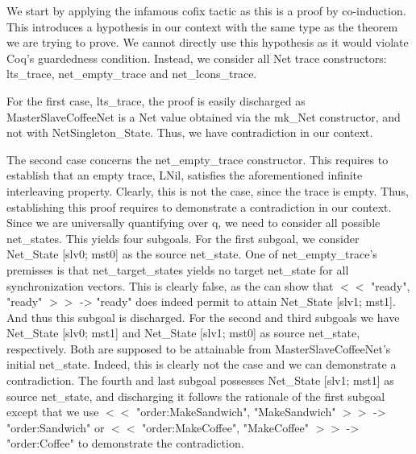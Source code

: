 \begin{theorem} \label{th:msproof2} 
			
		We start by applying the infamous \textsf{cofix} tactic as this is a proof by co-induction. This
		introduces a hypothesis in our context with the same type as the theorem we are trying to prove.
		We cannot directly use this hypothesis as it would violate Coq's guardedness condition.		
		Instead, we consider all \textsf{Net} trace constructors: \textsf{lts\_trace},
		\textsf{net\_empty\_trace} and \textsf{net\_lcons\_trace}.
		
		For the first case, \textsf{lts\_trace}, the proof is easily discharged as \textsf{MasterSlaveCoffeeNet}
		is a \textsf{Net} value obtained via the \textsf{mk\_Net} constructor, and not with 
		\textsf{NetSingleton\_State}. Thus, we have contradiction in our context.
				
		The second case concerns the \textsf{net\_empty\_trace} constructor. This requires to establish that
		an empty trace, \textsf{LNil}, satisfies the aforementioned infinite interleaving property. Clearly, this is not the
		case, since the trace is empty. Thus, establishing this proof requires to demonstrate a contradiction in our context.
		Since we are universally quantifying over \textsf{q}, we need to consider all possible \textsf{net\_states}. This yields
		four subgoals. For the first subgoal, we consider \textsf{Net_State [slv0; mst0]}	as the source \textsf{net\_state}.
		One of  \textsf{net\_empty\_trace}'s premisses is that \textsf{net\_target\_states} yields no target \textsf{net\_state} for all
		synchronization vectors. This is clearly false, as the can show that \textsf{$<<$ "ready", "ready" $>>$ -> "ready"}
		does indeed permit to attain  \textsf{Net_State [slv1; mst1]}. And thus this subgoal is discharged. For the
		second and third subgoals we have \textsf{Net_State [slv0; mst1]} and \textsf{Net_State [slv1; mst0]}  
		as source \textsf{net\_state}, respectively. Both are supposed to be \textsf{attainable} from \textsf{MasterSlaveCoffeeNet}'s initial
		\textsf{net\_state}. Indeed, this is clearly not the case and we can demonstrate a contradiction.
		The fourth and last subgoal possesses  \textsf{Net_State [slv1; mst1]} as source \textsf{net\_state}, and discharging it follows the rationale
		of the first subgoal except that we use \textsf{$<<$ "order:MakeSandwich", "MakeSandwich" $>>$ -> "order:Sandwich"}
		or \textsf{$<<$ "order:MakeCoffee", "MakeCoffee" $>>$ -> "order:Coffee"} to demonstrate the contradiction.
						

\end{theorem}
